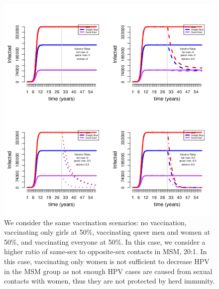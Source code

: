 \documentclass[12pt]{article}
\begin{document}
\begin{figure}[h!]
\includegraphics[width=\linewidth]{exampleFig/example2.png}
\caption{We consider the same vaccination scenarios: no vaccination, vaccinating only girls at 50\%, vaccinating queer men and women at 50\%, and vaccinating everyone at 50\%.  In this case, we consider a higher ratio of same-sex to opposite-sex contacts in MSM, 20:1.  In this case, vaccinating only women is not sufficient to decrease HPV in the MSM group as not enough HPV cases are caused from sexual contacts with women, thus they are not protected by herd immunity.}
\label{fig:example2}
\end{figure}
\end{document}
